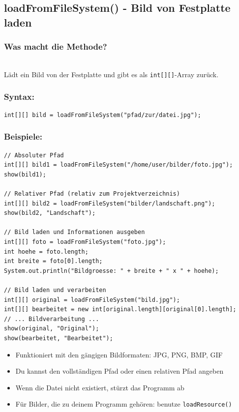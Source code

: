 \newpage


\subsection*{loadFromFileSystem() - Bild von Festplatte laden}

\subsubsection*{Was macht die Methode?}\\
Lädt ein Bild von der Festplatte und gibt es als \texttt{int[][]}-Array zurück.

\subsubsection*{Syntax:}
\begin{lstlisting}
int[][] bild = loadFromFileSystem("pfad/zur/datei.jpg");
\end{lstlisting}

\subsubsection*{Beispiele:}
\begin{lstlisting}
// Absoluter Pfad
int[][] bild1 = loadFromFileSystem("/home/user/bilder/foto.jpg");
show(bild1);

// Relativer Pfad (relativ zum Projektverzeichnis)
int[][] bild2 = loadFromFileSystem("bilder/landschaft.png");
show(bild2, "Landschaft");

// Bild laden und Informationen ausgeben
int[][] foto = loadFromFileSystem("foto.jpg");
int hoehe = foto.length;
int breite = foto[0].length;
System.out.println("Bildgroesse: " + breite + " x " + hoehe);

// Bild laden und verarbeiten
int[][] original = loadFromFileSystem("bild.jpg");
int[][] bearbeitet = new int[original.length][original[0].length];
// ... Bildverarbeitung ...
show(original, "Original");
show(bearbeitet, "Bearbeitet");
\end{lstlisting}

\begin{achtung}
	\begin{itemize}
		\item Funktioniert mit den gängigen Bildformaten: JPG, PNG, BMP, GIF
		\item Du kannst den vollständigen Pfad oder einen relativen Pfad angeben
		\item Wenn die Datei nicht existiert, stürzt das Programm ab
		\item Für Bilder, die zu deinem Programm gehören: benutze \texttt{loadResource()}
	\end{itemize}
\end{achtung}

